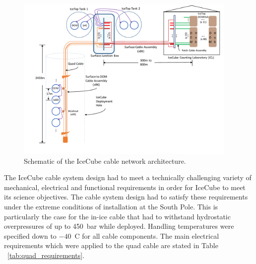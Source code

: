 \begin{figure}
  \centering
  \includegraphics[width=0.95\textwidth]{graphics/cables/cable_system_schematic.pdf}
  \caption{\label{fig:icecube-cables-logical}Schematic of the IceCube cable network architecture.}
\end{figure}

The IceCube cable system design had to meet a technically challenging
variety of mechanical, electrical and functional requirements in order for
IceCube to meet its science objectives. The cable
system design had to satisfy these requirements under the extreme
conditions of installation at the South Pole. This is particularly the case
for the in-ice cable that had to withstand hydrostatic
overpressures of up to 450~bar while deployed. Handling temperatures were specified down to $-40$~C for all
cable components. The main electrical requirements which were applied to the quad
cable are stated in Table ~\ref{tab:quad_requirements}.

